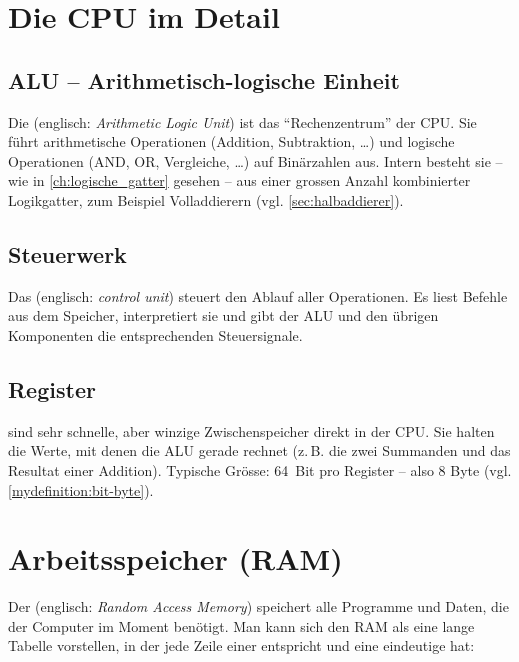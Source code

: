 \section{Die CPU im Detail}

\subsection{ALU -- Arithmetisch-logische Einheit}

Die  (englisch: \emph{Arithmetic Logic Unit}) ist das \enquote{Rechenzentrum} der CPU. Sie führt arithmetische Operationen (Addition, Subtraktion, \ldots) und logische Operationen (AND, OR, Vergleiche, \ldots) auf Binärzahlen aus. Intern besteht sie -- wie in \cref{ch:logische_gatter} gesehen -- aus einer grossen Anzahl kombinierter Logikgatter, zum Beispiel Volladdierern (vgl. \cref{sec:halbaddierer}).

\subsection{Steuerwerk}

Das  (englisch: \emph{control unit}) steuert den Ablauf aller Operationen. Es liest Befehle aus dem Speicher, interpretiert sie und gibt der ALU und den übrigen Komponenten die entsprechenden Steuersignale.

\subsection{Register}

 sind sehr schnelle, aber winzige Zwischenspeicher direkt in der CPU. Sie halten die Werte, mit denen die ALU gerade rechnet (z.\,B. die zwei Summanden und das Resultat einer Addition). Typische Grösse: 64~Bit pro Register -- also 8 Byte (vgl. \cref{mydefinition:bit-byte}).

\section{Arbeitsspeicher (RAM)}

Der  (englisch: \emph{Random Access Memory}) speichert alle Programme und Daten, die der Computer im Moment benötigt. Man kann sich den RAM als eine lange Tabelle vorstellen, in der jede Zeile einer  entspricht und eine eindeutige  hat:

